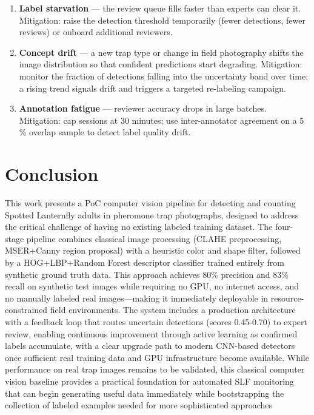 \documentclass[11pt, a4paper]{article}
\begin{document}
\begin{enumerate}[leftmargin=1.6em, itemsep=3pt]
  \item \textbf{Label starvation} --- the review queue fills faster than
        experts can clear it. Mitigation: raise the detection threshold
        temporarily (fewer detections, fewer reviews) or onboard additional
        reviewers.
  \item \textbf{Concept drift} --- a new trap type or change in field
        photography shifts the image distribution so that confident predictions
        start degrading. Mitigation: monitor the fraction of detections falling
        into the uncertainty band over time; a rising trend signals drift and
        triggers a targeted re-labeling campaign.
  \item \textbf{Annotation fatigue} --- reviewer accuracy drops in large
        batches. Mitigation: cap sessions at 30 minutes; use inter-annotator
        agreement on a 5\,\% overlap sample to detect label quality drift.
\end{enumerate}


\section{Conclusion}
This work presents a PoC computer vision pipeline for detecting and counting Spotted Lanternfly adults in pheromone trap photographs, designed to address the critical challenge of having no existing labeled training dataset. The four-stage pipeline combines classical image processing (CLAHE preprocessing, MSER+Canny region proposal) with a heuristic color and shape filter, followed by a HOG+LBP+Random Forest descriptor classifier trained entirely from synthetic ground truth data. This approach
achieves 80\% precision and 83\% recall on synthetic test images while requiring no GPU, no internet access, and no manually labeled real images—making it immediately deployable in resource-constrained field environments. The system includes a production architecture with a feedback loop that routes uncertain detections (scores 0.45-0.70) to expert review, enabling continuous improvement through active learning as confirmed labels accumulate, with a clear upgrade path to modern CNN-based detectors once sufficient real training data and GPU infrastructure become available. While performance on real trap images remains to be validated, this classical computer vision baseline provides a practical foundation for automated SLF monitoring that can begin generating useful data immediately while bootstrapping the collection of labeled examples needed for more sophisticated approaches


\end{document}
